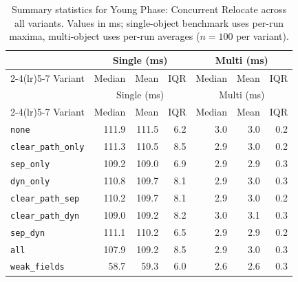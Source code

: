 \begin{longtable}[c]{l rrr rrr}
\caption[Young Phase: Concurrent Relocate summary statistics]{Summary statistics for Young Phase: Concurrent Relocate across all variants. Values in ms; single-object benchmark uses per-run maxima, multi-object uses per-run averages ($n=100$ per variant).}\label{tab:stats-young-relocate} \\
\toprule
 & \multicolumn{3}{c}{Single (ms)} & \multicolumn{3}{c}{Multi (ms)} \\
\cmidrule(lr){2-4}\cmidrule(lr){5-7}
Variant & Median & Mean & IQR & Median & Mean & IQR \\
\midrule
\endfirsthead
\toprule
 & \multicolumn{3}{c}{Single (ms)} & \multicolumn{3}{c}{Multi (ms)} \\
\cmidrule(lr){2-4}\cmidrule(lr){5-7}
Variant & Median & Mean & IQR & Median & Mean & IQR \\
\midrule
\endhead
\bottomrule
\endfoot
\texttt{none} & 111.9 & 111.5 & 6.2 & 3.0 & 3.0 & 0.2 \\
\texttt{clear\_path\_only} & 111.3 & 110.5 & 8.5 & 2.9 & 3.0 & 0.2 \\
\texttt{sep\_only} & 109.2 & 109.0 & 6.9 & 2.9 & 2.9 & 0.3 \\
\texttt{dyn\_only} & 110.8 & 109.7 & 8.1 & 2.9 & 3.0 & 0.3 \\
\texttt{clear\_path\_sep} & 110.2 & 109.7 & 8.1 & 2.9 & 3.0 & 0.2 \\
\texttt{clear\_path\_dyn} & 109.0 & 109.2 & 8.2 & 3.0 & 3.1 & 0.3 \\
\texttt{sep\_dyn} & 111.1 & 110.2 & 6.5 & 2.9 & 2.9 & 0.2 \\
\texttt{all} & 107.9 & 109.2 & 8.5 & 2.9 & 3.0 & 0.3 \\
\texttt{weak\_fields} & 58.7 & 59.3 & 6.0 & 2.6 & 2.6 & 0.3 \\
\end{longtable}
